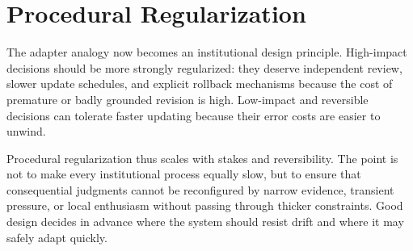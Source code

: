 
\chapter{Procedural Regularization}
\label{ch:ch101}

The adapter analogy now becomes an institutional design principle. High-impact decisions should be more strongly regularized: they deserve independent review, slower update schedules, and explicit rollback mechanisms because the cost of premature or badly grounded revision is high. Low-impact and reversible decisions can tolerate faster updating because their error costs are easier to unwind.

Procedural regularization thus scales with stakes and reversibility. The point is not to make every institutional process equally slow, but to ensure that consequential judgments cannot be reconfigured by narrow evidence, transient pressure, or local enthusiasm without passing through thicker constraints. Good design decides in advance where the system should resist drift and where it may safely adapt quickly.

